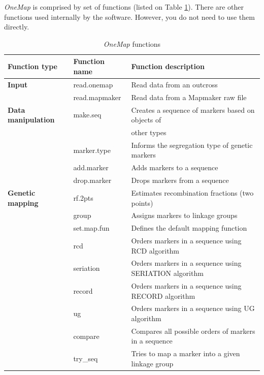 \documentclass[letterpaper,12pt,oneside]{article}
\begin{document}
{\sl OneMap} is comprised by set of functions (listed on Table \ref{commandtable}). There are other functions used internally by the software. However, you do not need to use them directly.

\begin{table}[!ht]
  \centering
  \small
  \caption{{\sl OneMap} functions}
  \label{commandtable}
  \begin{tabular}{lll}
    \hline\hline
    {\bf Function type}    & {\bf Function name} & {\bf Function description} \\
    \hline
    {\bf Input}             & read.onemap  & Read data from an outcross \\
                               & read.mapmaker  & Read data from a Mapmaker raw file \\
    \hline
    {\bf Data manipulation} & make.seq       & Creates a sequence of markers based on objects of \\
                               &                & other types \\
                               & marker.type    & Informs the segregation type of genetic markers \\
                               & add.marker     & Adds markers to a sequence\\
                               & drop.marker    & Drops markers from a sequence\\
    \hline
    {\bf Genetic mapping}   & rf.2pts        & Estimates recombination fractions (two points) \\
                               & group          & Assigns markers to linkage groups \\
                               & set.map.fun    & Defines the default mapping function\\
                               & rcd            & Orders markers in a sequence using RCD algorithm \\
                               & seriation      & Orders markers in a sequence using SERIATION algorithm \\
                               & record         & Orders markers in a sequence using RECORD algorithm \\
                               & ug             & Orders markers in a sequence using UG algorithm \\
                               & compare        & Compares all possible orders of markers in a sequence \\
                               & try_seq        & Tries to map a marker into a given linkage group \\

\end{tabular}
\end{table}
\end{document}
